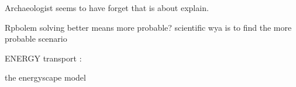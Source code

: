 Archaeologist seems to have forget that is about explain.

Rpbolem solving
better means more probable?
scientific wya is to find the more probable scenario

ENERGY transport :

the energyscape model
